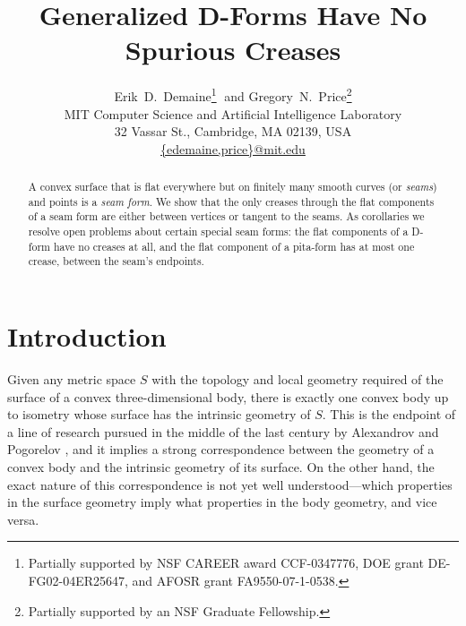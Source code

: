 \documentclass{article}
\begin{document}
\title{Generalized D-Forms Have No Spurious Creases}
\author{Erik~D.~Demaine\footnote{Partially supported by NSF CAREER
    award CCF-0347776, DOE grant DE-FG02-04ER25647, and AFOSR grant
    FA9550-07-1-0538.}$\;$
 and Gregory~N.~Price\footnote{Partially supported by an NSF
    Graduate Fellowship.}\\
  MIT Computer Science and Artificial Intelligence Laboratory \\
  32 Vassar St., Cambridge, MA 02139, USA \\
  \protect\url{{edemaine,price}@mit.edu}
} \date{}
\maketitle

\begin{abstract}
  A convex surface that is flat everywhere but on finitely many
  smooth curves (or \emph{seams}) and points is a \emph{seam form}.
  We show that the only creases through the flat components of a seam
  form are either between vertices or tangent to the seams.  As
  corollaries we resolve open problems about certain special seam
  forms: the flat components of a D-form have no creases at all, and the
  flat component of a pita-form has at most one crease, between the seam's
  endpoints.
\end{abstract}

\newpage

\section{Introduction} \label{sec:introduction}

Given any metric space $S$ with the topology and local geometry
required of the surface of a convex three-dimensional body,
there is exactly one convex body up to isometry whose surface has
the intrinsic geometry of $S$.  This is the endpoint of a line of
research pursued in the middle of the last century by Alexandrov and
Pogorelov \cite{Alexandrov}, and it implies a strong correspondence
between the geometry of a convex body and the intrinsic geometry of
its surface.  On the other hand, the exact nature of this
correspondence is not yet well understood---which properties in the
surface geometry imply what properties in the body geometry, and vice
versa.
\end{document}
